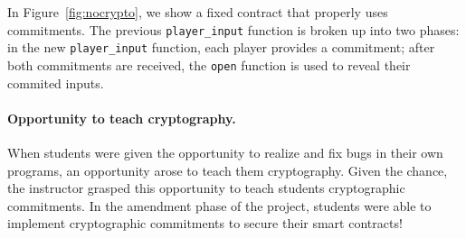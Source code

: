 \documentclass{llncs}
\newcommand{\elaine}[1]{}
\newcommand{\ignore}[1]{}
\begin{document}
In Figure~\ref{fig:nocrypto}, we show a fixed contract that properly uses commitments. The previous \texttt{player\_input} function is broken up into two phases: in the new \texttt{player\_input} function, each player provides a commitment; after both commitments are received, the \texttt{open} function is used to reveal their commited inputs.

\paragraph{Opportunity to teach cryptography.}
When students were given the opportunity to realize and fix bugs 
in their own programs, an opportunity arose to  
teach them cryptography.
Given the chance, the instructor
grasped this opportunity to teach students cryptographic commitments. 
In the amendment phase of the project,
students were able to implement cryptographic commitments
to secure their smart contracts!




\ignore{
Cryptography is often the first line of defense against security hazards in smart contract programming. In the example above, players reveal too much plaintext information, which can be used by an attacker to spoil the game. In the section, we'll describe how to apply cryptographic commitments to fix this problem.

In our RPS contract the user is using a numeric scale as their input with 0: rock, 1: paper, 2: scissors. Let's take a look at the function that registers their inputs and think about possible vulnerabilities:
}


\elaine{in figures, can we put in framed boxes the lines
that have problems.}
\end{document}
